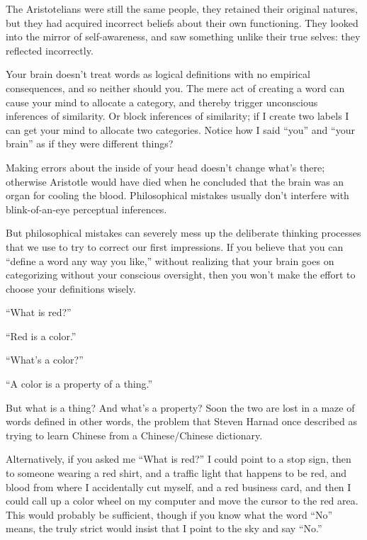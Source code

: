 {
 The Aristotelians were still the same people, they retained their
original natures, but they had acquired incorrect beliefs about their
own functioning. They looked into the mirror of self-awareness, and saw
something unlike their true selves: they reflected incorrectly.}

{
 Your brain doesn't treat words as logical
definitions with no empirical consequences, and so neither should you.
The mere act of creating a word can cause your mind to allocate a
category, and thereby trigger unconscious inferences of similarity. Or
block inferences of similarity; if I create two labels I can get your
mind to allocate two categories. Notice how I said
``you'' and ``your
brain'' as if they were different things?}

{
 Making errors about the inside of your head
doesn't change what's there; otherwise
Aristotle would have died when he concluded that the brain was an organ
for cooling the blood. Philosophical mistakes usually
don't interfere with blink-of-an-eye perceptual
inferences.}

{
 But philosophical mistakes can severely mess up the deliberate
thinking processes that we use to try to correct our first impressions.
If you believe that you can ``define a word any way
you like,'' without realizing that your brain goes on
categorizing without your conscious oversight, then you
won't make the effort to choose your definitions
wisely.}

\myendsectiontext


{
 ``What is red?''}

{
 ``Red is a color.''}

{
 ``What's a
color?''}

{
 ``A color is a property of a
thing.''}

{
 But what is a thing? And what's a property? Soon
the two are lost in a maze of words defined in other words, the problem
that Steven Harnad once described as trying to learn Chinese from a
Chinese/Chinese dictionary.}

{
 Alternatively, if you asked me ``What is
red?'' I could point to a stop sign, then to someone
wearing a red shirt, and a traffic light that happens to be red, and
blood from where I accidentally cut myself, and a red business card,
and then I could call up a color wheel on my computer and move the
cursor to the red area. This would probably be sufficient, though if
you know what the word ``No'' means,
the truly strict would insist that I point to the sky and say
``No.''}

